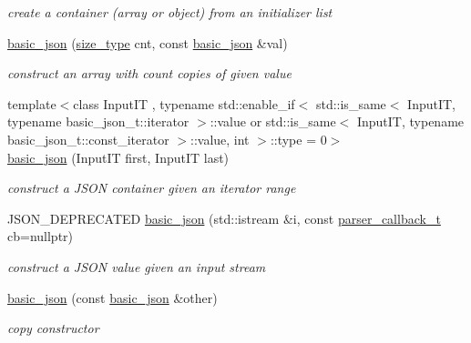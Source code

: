 \begin{DoxyCompactItemize}
\begin{DoxyCompactList}\small\item\em create a container (array or object) from an initializer list \end{DoxyCompactList}\item 
\hyperlink{classnlohmann_1_1basic__json_a112a2d8e76345ea64f71e2985fee4c52}{basic\+\_\+json} (\hyperlink{classnlohmann_1_1basic__json_a1579a8f72a230358d6cd1a6e8a62859b}{size\+\_\+type} cnt, const \hyperlink{classnlohmann_1_1basic__json}{basic\+\_\+json} \&val)
\begin{DoxyCompactList}\small\item\em construct an array with count copies of given value \end{DoxyCompactList}\item 
{\footnotesize template$<$class Input\+I\+T , typename std\+::enable\+\_\+if$<$                                                              std\+::is\+\_\+same$<$ Input\+I\+T, typename basic\+\_\+json\+\_\+t\+::iterator $>$\+::value or                                                           std\+::is\+\_\+same$<$ Input\+I\+T, typename basic\+\_\+json\+\_\+t\+::const\+\_\+iterator $>$\+::value, int $>$\+::type  = 0$>$ }\\\hyperlink{classnlohmann_1_1basic__json_af7acf3838a79363356f24538941a559c}{basic\+\_\+json} (Input\+I\+T first, Input\+I\+T last)
\begin{DoxyCompactList}\small\item\em construct a J\+S\+O\+N container given an iterator range \end{DoxyCompactList}\item 
J\+S\+O\+N\+\_\+\+D\+E\+P\+R\+E\+C\+A\+T\+E\+D \hyperlink{classnlohmann_1_1basic__json_a32350263eb105764844c5a85e156a255}{basic\+\_\+json} (std\+::istream \&i, const \hyperlink{classnlohmann_1_1basic__json_a9e35475e2027520a78e09f460dbe048a}{parser\+\_\+callback\+\_\+t} cb=nullptr)
\begin{DoxyCompactList}\small\item\em construct a J\+S\+O\+N value given an input stream \end{DoxyCompactList}\item 
\hyperlink{classnlohmann_1_1basic__json_a4ab93491f82545342562c7ee7e3166c7}{basic\+\_\+json} (const \hyperlink{classnlohmann_1_1basic__json}{basic\+\_\+json} \&other)
\begin{DoxyCompactList}\small\item\em copy constructor \end{DoxyCompactList}\item 

\end{DoxyCompactItemize}
